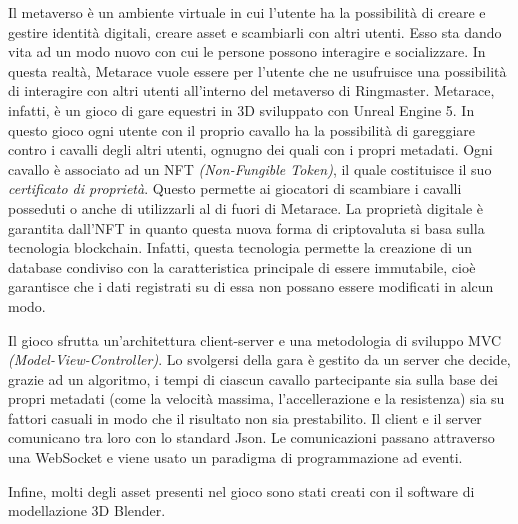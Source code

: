 Il metaverso è un ambiente virtuale in cui l'utente ha la possibilità di creare e gestire identità digitali, creare asset e scambiarli con altri utenti. Esso sta dando vita ad un modo nuovo con cui le persone possono interagire e socializzare.
%
In questa realtà, Metarace vuole essere per l'utente che ne usufruisce una possibilità di interagire con altri utenti all'interno del metaverso di Ringmaster.
%
Metarace, infatti, è un gioco di gare equestri in 3D sviluppato con Unreal Engine 5.
%
In questo gioco ogni utente con il proprio cavallo ha la possibilità di gareggiare contro i cavalli degli altri utenti, ognugno dei quali con i propri metadati. 
%
Ogni cavallo è associato ad un NFT \textit{(Non-Fungible Token)}, il quale costituisce il suo \textit{certificato di proprietà}. Questo permette ai giocatori di scambiare i cavalli posseduti o anche di utilizzarli al di fuori di Metarace.
%
La proprietà digitale è garantita dall'NFT in quanto questa nuova forma di criptovaluta si basa sulla tecnologia blockchain. Infatti, questa tecnologia permette la creazione di un database condiviso con la caratteristica principale di essere immutabile, cioè garantisce che i dati registrati su di essa non possano essere modificati in alcun modo. 

Il gioco sfrutta un'architettura client-server e una metodologia di sviluppo MVC \textit{(Model-View-Controller)}. 
%
Lo svolgersi della gara è gestito da un server che decide, grazie ad un algoritmo, i tempi di ciascun cavallo partecipante sia sulla base dei propri metadati (come la velocità massima, l'accellerazione e la resistenza) sia su fattori casuali in modo che il risultato non sia prestabilito.
%
Il client e il server comunicano tra loro con lo standard Json. Le comunicazioni passano attraverso una WebSocket e viene usato un paradigma di programmazione ad eventi.

Infine, molti degli asset presenti nel gioco sono stati creati con il software di modellazione 3D Blender.